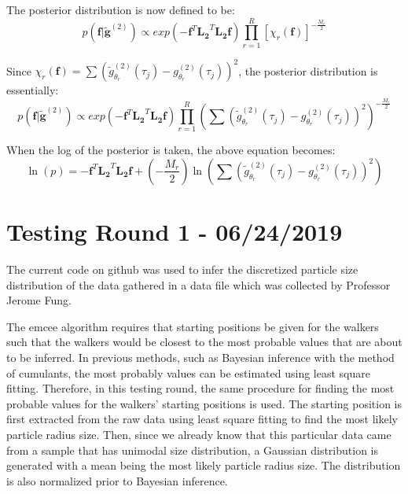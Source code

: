 \documentclass[11pt]{article}
\begin{document}
The posterior distribution is now defined to be:
\begin{equation}
p(\mathbf{f}|\tilde{\mathbf{g}}^{(2)}) \propto exp\left( -\mathbf{f}^T\mathbf{L_2}^T \mathbf{L_2}\mathbf{f}\right) \prod_{r=1}^{R} {\left[\chi_r(\mathbf{f})\right]}^{-\frac{M_r}{2}}
\end{equation}

Since $\chi_r(\mathbf{f}) = \sum {\left( \tilde{g}^{(2)}_{\theta_r} (\tau_j) - g^{(2)}_{\theta_r}(\tau_j) \right)}^2$, the posterior distribution is essentially:
\begin{equation}
p(\mathbf{f}|\tilde{\mathbf{g}}^{(2)}) \propto exp\left( -\mathbf{f}^T\mathbf{L_2}^T \mathbf{L_2}\mathbf{f}\right) \prod_{r=1}^{R} {\left( \sum{(\tilde{g}^{(2)}_{\theta_r} (\tau_j) - g^{(2)}_{\theta_r}(\tau_j) )}^2 \right)}^{-\frac{M_r}{2}}
\end{equation}

When the log of the posterior is taken, the above equation becomes:
\begin{equation}
\ln(p) = -\mathbf{f}^T\mathbf{L_2}^T \mathbf{L_2}\mathbf{f} + \left(-\frac{M_r}{2} \right) \ln \left(\sum {\left( \tilde{g}^{(2)}_{\theta_r} (\tau_j) - g^{(2)}_{\theta_r} (\tau_j) \right)}^2 \right)
\end{equation}


\section{Testing Round 1 - 06/24/2019}
The current code on github was used to infer the discretized particle size distribution of the data gathered in a data file which was collected by Professor Jerome Fung. 

The emcee algorithm requires that starting positions be given for the walkers such that the walkers would be closest to the most probable values that are about to be inferred. In previous methods, such as Bayesian inference with the method of cumulants, the most probably values can be estimated using least square fitting. Therefore, in this testing round, the same procedure for finding the most probable values for the walkers' starting positions is used. The starting position is first extracted from the raw data using least square fitting to find the most likely particle radius size. Then, since we already know that this particular data came from a sample that has unimodal size distribution, a Gaussian distribution is generated with a mean being the most likely particle radius size. The distribution is also normalized prior to Bayesian inference. 
\end{document}
